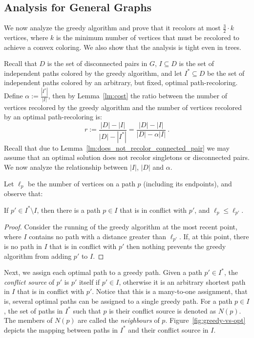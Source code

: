 
\subsection{Analysis for General Graphs}

We now analyze the greedy algorithm and prove that it recolors at most 
$\frac{3}{2} \cdot k$ vertices, 
where $k$ is the minimum number of vertices that must be recolored to achieve a convex
coloring.
%
We also show that the analysis is tight even in trees.

Recall that $D$ is the set of disconnected pairs in $G$, 
$I \subseteq D$ is the set of independent paths colored by the greedy algorithm, 
and let $I^* \subseteq D$ be the set of independent paths colored by an arbitrary, 
but fixed,
optimal path-recoloring.  
%
Define $\alpha := \frac{|I^*|}{|I|}$,
then by Lemma~\ref{lm:cost} the ratio between the number of 
vertices recolored by the greedy algorithm and the number of vertices
recolored by an optimal path-recoloring is:
\[
r := \frac{|D| - |I|}{|D| - |I^*|}
= \frac{|D| - |I|}{|D| - \alpha |I|}
~.
\]
Recall that due to Lemma~\ref{lm:does_not_recolor_connected_pair} we
may assume that an optimal solution does not recolor singletons or
disconnected pairs.
%
We now analyze the relationship between $|I|$, $|D|$ and $\alpha$.

Let $\ell_p$ be the number of vertices on a path $p$ (including its endpoints), 
and observe that:

\begin{lemma}
\label{lemma:assign}
If $p' \in I^* \setminus I$, then there is a path $p \in I$ that is in
conflict with $p'$, and $\ell_p \leq \ell_{p'}$.
\end{lemma}
\begin{proof}
Consider the running of the greedy algorithm at the most recent point,
where $I$ contains no path with a distance greater than $\ell_{p'}$.  If,
at this point, there is no path in $I$ that is in conflict with $p'$
then nothing prevents the greedy algorithm from adding $p'$ to $I$.
{}\end{proof}

Next, we assign each optimal path to a greedy path.
%
Given a path $p' \in I^*$, the \emph{conflict source} of $p'$ is $p'$
itself if $p' \in I$, otherwise it is an arbitrary shortest path in
$I$ that is in conflict with $p'$.
%
Notice that this is a many-to-one assignment, that is, several optimal
paths can be assigned to a single greedy path.
%
For a path $p \in I$, the set of paths in $I^*$ such that $p$ is their
conflict source is denoted as $N(p)$.
The members of $N(p)$ are called the \emph{neighbours} of $p$.
Figure~\ref{fig:greedy-vs-opt} depicts the mapping between paths in 
$I^*$ and their conflict source in $I$.

